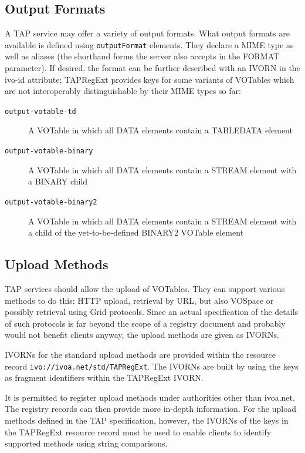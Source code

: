 \documentclass{ivoa}
\begin{document}
\subsection{Output Formats}

\label{outforms}

A TAP service may offer a variety of output formats.
What output formats are available is defined using
\texttt{outputFormat} elements.   They 
declare a MIME type \citep{std:RFC2045} as well
as aliases (the shorthand forms the server also accepts in the 
FORMAT parameter).  If desired, the format can be further described with an
IVORN in the ivo-id attribute; TAPRegExt provides keys for some variants of
VOTables which are not interoperably distinguishable by their MIME types so far:


\begin{description}
\item[\texttt{output-votable-td}]A VOTable in which all DATA elements contain a TABLEDATA element
\item[\texttt{output-votable-binary}]A VOTable in which all DATA elements contain a STREAM element
	with a BINARY child
\item[\texttt{output-votable-binary2}]A VOTable in which all DATA elements contain a STREAM element
	with a child of the yet-to-be-defined BINARY2 VOTable element
\end{description}


\subsection{Upload Methods}

\label{uploadmethods}

TAP services should allow the upload of VOTables.  They can support
various methods to do this: HTTP upload, retrieval by URL, but also VOSpace
or possibly retrieval using Grid protocols.  Since an actual specification
of the details of such protocols is far beyond the scope of a registry
document and probably would not benefit clients anyway, the upload
methods are given as IVORNs.

IVORNs for the standard upload methods are provided within the
resource record
\texttt{ivo://ivoa.net/std/TAPRegExt}.  
The IVORNs are built by using the keys as fragment identifiers within the 
TAPRegExt IVORN.

It is permitted to register upload methods under authorities other than
ivoa.net.
The registry records can then provide more in-depth information. For
the upload methods defined in the TAP specification, however, 
the IVORNs of the keys in the TAPRegExt resource record must be used to enable
clients to identify supported methods using string comparisons.
\end{document}
